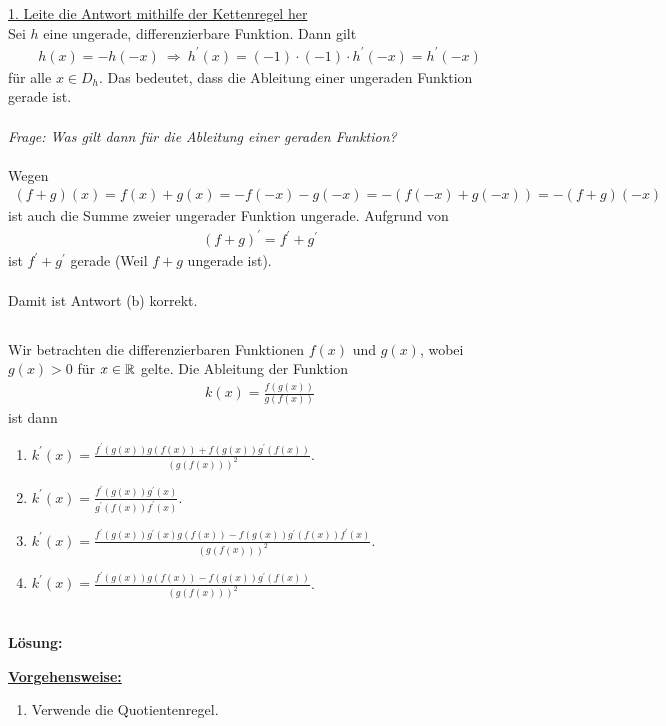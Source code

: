 \underline{1. Leite die Antwort mithilfe der Kettenregel her}\\
Sei $ h  $ eine ungerade, differenzierbare Funktion.
Dann gilt
\begin{align*}
	h(x) = -h(-x)
	\ \Rightarrow \
	h^\prime (x) = (-1) \cdot (-1) \cdot h^\prime(-x) = h^\prime(-x)
\end{align*}
für alle $ x \in D_h $. Das bedeutet, dass die Ableitung einer ungeraden Funktion gerade ist.\\
\\
\textit{Frage: Was gilt dann für die Ableitung einer geraden Funktion?}\\
\\
Wegen 
\begin{align*}
	(f+g)(x) = f(x) +g(x) =-f(-x) - g(-x)
	=-(f(-x) + g(-x))= -(f+g)(-x)
\end{align*}
ist auch die Summe zweier ungerader Funktion ungerade. Aufgrund von 
\begin{align*}
	(f+g)^\prime = f^\prime + g^\prime
\end{align*}
ist $ f^\prime + g^\prime $ gerade (Weil $ f+g $ ungerade ist).\\
\\
Damit ist Antwort (b) korrekt.


\newpage
\subsection*{}
Wir betrachten die differenzierbaren Funktionen $ f(x) $ und $ g(x) $, wobei $ g(x) > 0 $ für $ x \in \mathbb{R} $ gelte. Die Ableitung der Funktion
\begin{align*}
	k(x)
	=
	\frac{f(g(x))}{g(f(x))}
\end{align*}
ist dann
\renewcommand{\labelenumi}{(\alph{enumi})}
\begin{enumerate}
	\item 
	$ k^\prime(x) = \frac{f^\prime(g(x))g(f(x)) + f(g(x))g^\prime(f(x))}{(g(f(x)))^2} $.
	\item
	$ k^\prime(x) = \frac{f^\prime(g(x))g^\prime(x) }{g^\prime(f(x))f^\prime(x)} $.
	
	\item
	$ k^\prime(x) = 
	\frac{f^\prime(g(x))g^\prime(x)g(f(x)) - f(g(x)) g^\prime(f(x)) f^\prime(x) }
	{(g(f(x)))^2} $.
	\item
	$ k^\prime(x) = \frac{f^\prime(g(x))g(f(x)) - f(g(x))g^\prime(f(x))}{(g(f(x)))^2} $.
\end{enumerate}
\ \\
\textbf{Lösung:}
\begin{mdframed}
	\underline{\textbf{Vorgehensweise:}}
	\renewcommand{\labelenumi}{\theenumi.}
	\begin{enumerate}
		\item Verwende die Quotientenregel.
	\end{enumerate}
\end{mdframed}

